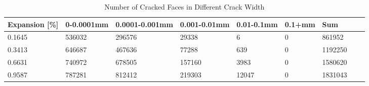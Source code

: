 
\begin{table}[ht!]
    \centering
    \begin{tabular}{| p{2.0cm} | p{1.6cm} | p{1.6cm} | p{1.6cm} | p{1.6cm} | p{1.6cm} | p{1.6cm} | p{1.6cm} | p{2.0cm} | }
    \hline
    
	Expansion [\%] & 0-0.0001mm & 0.0001-0.001mm & 0.001-0.01mm & 0.01-0.1mm & 0.1+mm & Sum \\ \hline
	
    0.1645 &	536032 &	296576 &	29338 &	6 &	0 &	861952\\ \hline
    0.3413 &	646687 &	467636 &	77288 &	639 &	0 &	1192250\\ \hline
    0.6631 &	740972 &	678505 &	157160 &	3983 &	0 &	1580620\\ \hline
    0.9587 &	787281 &	812412 &	219303 &	12047 &	0 &	1831043\\ \hline

    \end{tabular}
    \caption{Number of Cracked Faces in Different Crack Width}
    \label{}
\end{table}


